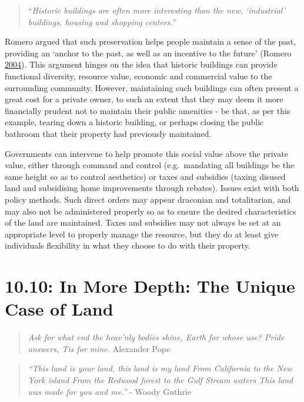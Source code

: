 \documentclass[]{tufte-handout}
\begin{document}
\begin{quote}
``\emph{Historic buildings are often more interesting than the new,
`industrial' buildings, housing and shopping centers.}''
\end{quote}

Romero argued that such preservation helps people maintain a sense of
the past, providing an `anchor to the past, as well as an incentive to
the future' (Romero \protect\hyperlink{ref-romero2004}{2004}). This
argument hinges on the idea that historic buildings can provide
functional diversity, resource value, economic and commercial value to
the surrounding community. However, maintaining such buildings can often
present a great cost for a private owner, to such an extent that they
may deem it more financially prudent not to maintain their public
amenities - be that, as per this example, tearing down a historic
building, or perhaps closing the public bathroom that their property had
previously maintained.

Governments can intervene to help promote this social value above the
private value, either through command and control (e.g.~mandating all
buildings be the same height so as to control aesthetics) or taxes and
subsidies (taxing disused land and subsidising home improvements through
rebates). Issues exist with both policy methods. Such direct orders may
appear draconian and totalitarian, and may also not be administered
properly so as to ensure the desired characteristics of the land are
maintained. Taxes and subsidies may not always be set at an appropriate
level to properly manage the resource, but they do at least give
individuals flexibility in what they choose to do with their property.

\hypertarget{in-more-depth-the-unique-case-of-land}{%
\section{10.10: In More Depth: The Unique Case of
Land}\label{in-more-depth-the-unique-case-of-land}}

\begin{quote}
\emph{Ask for what end the heav'nly bodies shine, Earth for whose use?
Pride answers, Tis for mine.} Alexander Pope
\end{quote}

\begin{quote}
\emph{``This land is your land, this land is my land From California to
the New York island From the Redwood forest to the Gulf Stream waters
This land was made for you and me.''} - Woody Guthrie
\end{quote}
\end{document}
